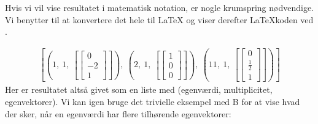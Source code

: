 \documentclass[letterpaper,10pt,english]{jupyterBook}
\begin{document}
Hvis vi vil vise resultatet i matematisk notation, er nogle krumspring nødvendige. Vi benytter  til at konvertere det hele til LaTeX og viser derefter LaTeX\sphinxhyphen{}koden ved .

\begin{sphinxVerbatim}[commandchars=\\\{\}]
   
\end{sphinxVerbatim}
\begin{equation*}
\begin{split}\displaystyle \left[ \left( 1, \  1, \  \left[ \left[\begin{matrix}0\\-2\\1\end{matrix}\right]\right]\right), \  \left( 2, \  1, \  \left[ \left[\begin{matrix}1\\0\\0\end{matrix}\right]\right]\right), \  \left( 11, \  1, \  \left[ \left[\begin{matrix}0\\\frac{1}{2}\\1\end{matrix}\right]\right]\right)\right]\end{split}
\end{equation*}
Her er resultatet altså givet som en liste med (egenværdi, multiplicitet, egenvektorer). Vi kan igen bruge det trivielle eksempel med B for at vise hvad der sker, når en egenværdi har flere tilhørende egenvektorer:
\end{document}
